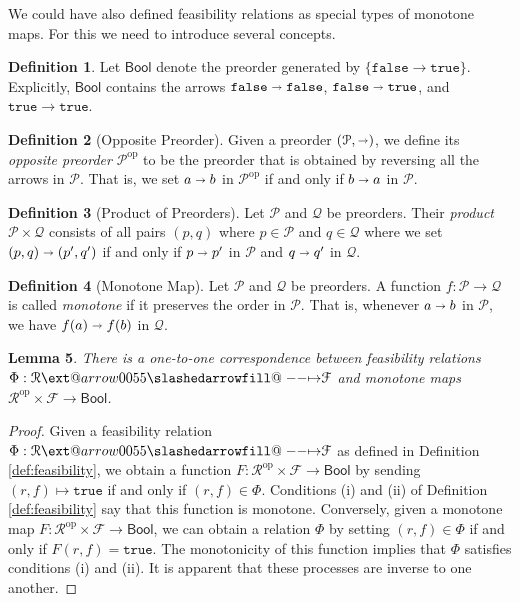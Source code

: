 \documentclass[12pt]{article}
\makeatletter
\theoremstyle{definition}
\newtheorem{definition}{Definition}[section]
\theoremstyle{plain}
\newtheorem{lemma}[definition]{Lemma}
\theoremstyle{plain}
\theoremstyle{plain}
\theoremstyle{plain}
\theoremstyle{remark}
\theoremstyle{remark}
\newcommand{\mc}[1]{\mathcal{#1}}
\newcommand{\true}{\mathtt{true}}
\newcommand{\false}{\mathtt{false}}
\def\slashedarrowfill@#1#2#3#4#5{%
	$\m@th\thickmuskip0mu\medmuskip\thickmuskip\thinmuskip\thickmuskip
	\relax#5#1\mkern-7mu%
	\cleaders\hbox{$#5\mkern-2mu#2\mkern-2mu$}\hfill
	\mathclap{#3}\mathclap{#2}%
	\cleaders\hbox{$#5\mkern-2mu#2\mkern-2mu$}\hfill
	\mkern-7mu#4$%
}
\def\rightslashedarrowfill@{%
	\slashedarrowfill@\relbar\relbar\mapstochar\rightarrow}
\newcommand\xslashedrightarrow[2][]{%
	\ext@arrow 0055{\rightslashedarrowfill@}{#1}{#2}}
\makeatother
\begin{document}
We could have also defined feasibility relations as special types of monotone maps. For this we need to introduce several concepts.

\begin{definition}
	Let $\mathsf{Bool}$ denote the preorder generated by $\{\false \rightarrow \true\}$. Explicitly, $\mathsf{Bool}$ contains the arrows $\false \shortrightarrow \false$, $\false \shortrightarrow \true$, and $\true \rightarrow \true$.
\end{definition}

\begin{definition}[Opposite Preorder]
	Given a preorder $(\mc{P},\shortrightarrow)$, we define its \emph{opposite preorder} $\mc{P}^\text{op}$ to be the preorder that is obtained by reversing all the arrows in $\mc{P}$. That is, we set $a \shortrightarrow b$ in $\mc{P}^\text{op}$ if and only if $b \shortrightarrow a$ in $\mc{P}$. 
\end{definition}

\begin{definition}[Product of Preorders]
	Let $\mc{P}$ and $\mc{Q}$ be preorders. Their \emph{product} $\mc{P} \times \mc{Q}$ consists of all pairs $(p,q)$ where $p \in \mc{P}$ and $q \in \mc{Q}$ where we set $(p,q) \shortrightarrow (p',q')$ if and only if $p \shortrightarrow p'$ in $\mc{P}$ and $q \shortrightarrow q'$ in $\mc{Q}$.
\end{definition}

\begin{definition}[Monotone Map]
	Let $\mc{P}$ and $\mc{Q}$ be preorders. A function $f: \mc{P} \rightarrow \mc{Q}$ is called \emph{monotone} if it preserves the order in $\mc{P}$. That is, whenever $a \shortrightarrow b$ in $\mc{P}$, we have $f(a) \shortrightarrow f(b)$ in $\mc{Q}$.
\end{definition}

\begin{lemma}
	There is a one-to-one correspondence between feasibility relations $\Phi: \mc{R} \xslashedrightarrow{} \mc{F}$ and monotone maps $\mc{R}^\text{op} \times \mc{F} \rightarrow \mathsf{Bool}$.
\end{lemma}
\begin{proof}
	Given a feasibility relation $\Phi: \mc{R} \xslashedrightarrow{} \mc{F}$ as defined in Definition \ref{def:feasibility}, we obtain a function $F: \mc{R}^\text{op} \times \mc{F} \rightarrow \mathsf{Bool}$ by sending $(r,f) \mapsto \true$ if and only if $(r,f) \in \Phi$. Conditions (i) and (ii) of Definition \ref{def:feasibility} say that this function is monotone. Conversely, given a monotone map $F: \mc{R}^\text{op} \times \mc{F} \rightarrow \mathsf{Bool}$, we can obtain a relation $\Phi$ by setting $(r,f) \in \Phi$ if and only if $F(r,f) = \true$. The monotonicity of this function implies that $\Phi$ satisfies conditions (i) and (ii). It is apparent that these processes are inverse to one another.
\end{proof}
\end{document}
